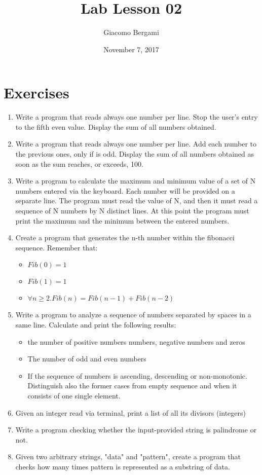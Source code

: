\documentclass[]{scrartcl}
\title{Lab Lesson 02}
\date{November 7, 2017}
\author{Giacomo Bergami}
\begin{document}
\maketitle
\section*{Exercises}
\begin{enumerate}
\item Write a program that reads always one number per line.
Stop the user's entry to the fifth even value.
Display the sum of all numbers obtained.
\item Write a program that reads always one number per line.
Add each number to the previous ones, only if is odd.
Display the sum of all numbers obtained as soon as the sum reaches, or exceeds, 100.
\item Write a program to calculate the maximum and minimum value of a set of N numbers entered via the keyboard.
Each number will be provided on a separate line. The program must read the value of N, and then it must read
a sequence of N numbers by N distinct lines. At this point the program must print the maximum and the
minimum between the entered numbers.
\item Create a program that generates the n-th number within the fibonacci sequence. Remember that:
\begin{itemize}
	\item $Fib(0) = 1$
	\item $Fib(1) = 1$
	\item $\forall n\geq 2. Fib(n) = Fib(n-1)+Fib(n-2)$
\end{itemize}
\item Write a program to analyze a sequence of numbers separated by spaces in a same line.
Calculate and print the following results:
\begin{itemize}
	\item the number of positive numbers numbers, negative numbers and zeros
	\item The number of odd and even numbers
	\item If the sequence of numbers is ascending, descending or non-monotonic. Distinguish also the former cases from empty sequence and when it consists of one single element.
	
\end{itemize}

\item Given an integer read via terminal, print a list of all its divisors (integers)
\item Write a program checking whether the input-provided string is palindrome or not.
\item Given two arbitrary strings, "data" and "pattern", create a program that checks how many times pattern is represented as a substring of data.


\end{enumerate}
\end{document}

